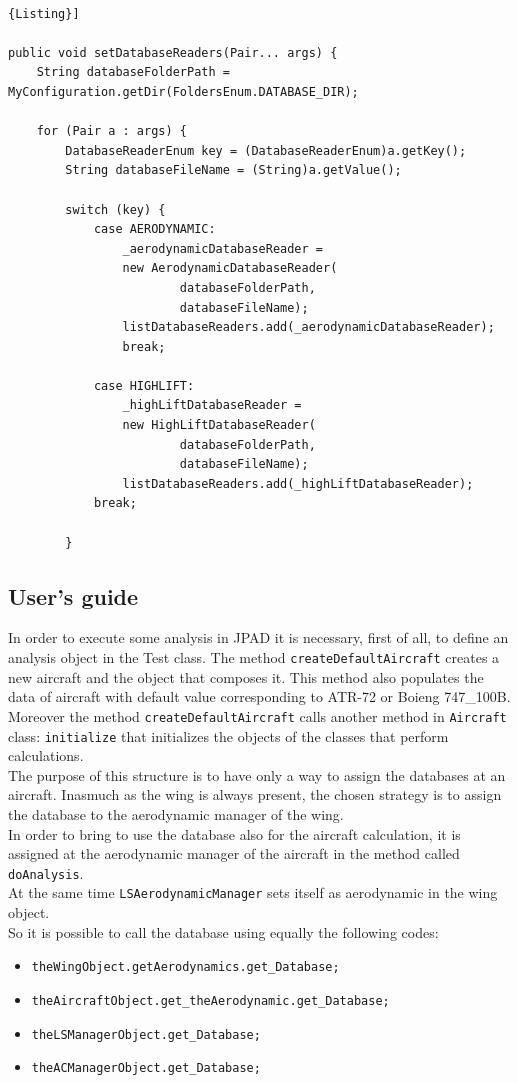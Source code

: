\noindent \\
\begin{lstlisting}[frame=rbl,caption={{\footnotesize \texttt{setDatabaseReaders} method}},label= [style=\bfseries]{Listing}]

public void setDatabaseReaders(Pair... args) {
	String databaseFolderPath = MyConfiguration.getDir(FoldersEnum.DATABASE_DIR);
	
	for (Pair a : args) {
		DatabaseReaderEnum key = (DatabaseReaderEnum)a.getKey(); 
		String databaseFileName = (String)a.getValue();
		
		switch (key) {
			case AERODYNAMIC:
				_aerodynamicDatabaseReader = 
				new AerodynamicDatabaseReader(
						databaseFolderPath,
						databaseFileName); 
				listDatabaseReaders.add(_aerodynamicDatabaseReader);
				break;
				
			case HIGHLIFT:
				_highLiftDatabaseReader = 
				new HighLiftDatabaseReader(
						databaseFolderPath, 
						databaseFileName); 
				listDatabaseReaders.add(_highLiftDatabaseReader);
			break;	
			
		}
\end{lstlisting}


\subsection {User's guide}

In order to execute some analysis in JPAD it is necessary, first of all, to define an analysis object in the Test class. The method \texttt{createDefaultAircraft} creates a new aircraft and the object that composes it. This method also populates the data of aircraft with default value corresponding to ATR-72 or Boieng 747\_100B. Moreover the method \texttt{createDefaultAircraft} calls another method in \texttt{Aircraft} class: \texttt{initialize} that initializes the objects of the classes that perform calculations. \\
The purpose of this structure is to have only a way to assign the databases at an aircraft. Inasmuch as the wing is always present, the chosen strategy is to assign the database to the aerodynamic manager of the wing.\\
In order to bring to use the database also for the aircraft calculation, it is assigned at the aerodynamic manager of the aircraft in the method called \texttt{doAnalysis}.\\
At the same time \texttt{LSAerodynamicManager} sets itself as aerodynamic in the wing object. \\
So it is possible to call the database using equally the following codes: 
\begin{itemize}
\item \texttt{theWingObject.getAerodynamics.get\_Database;}
\item \texttt{theAircraftObject.get\_theAerodynamic.get\_Database;}
\item \texttt{theLSManagerObject.get\_Database;}
\item \texttt{theACManagerObject.get\_Database;}
\end{itemize}

